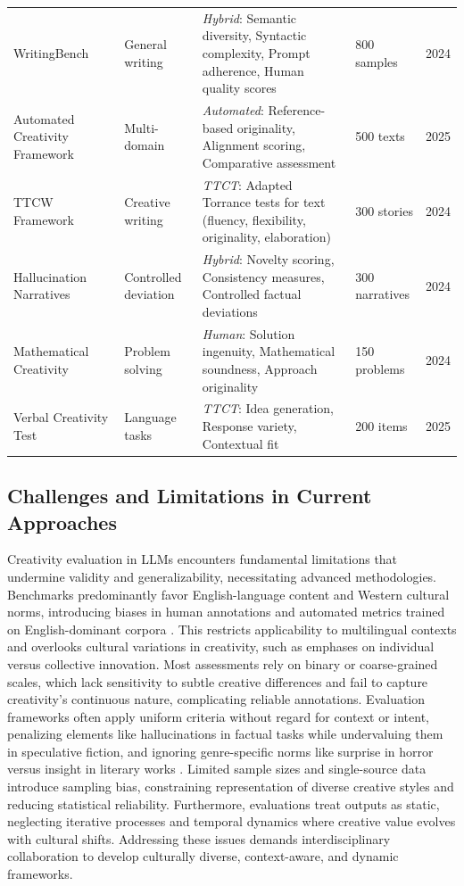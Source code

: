 \documentclass{llncs}
\begin{document}
\begin{table}[ht]
{\begin{tabular}{l l p{8cm} l l}
WritingBench~\cite{wu2024writingbench}   & General writing & \textit{Hybrid}: Semantic diversity, Syntactic complexity, Prompt adherence, Human quality scores & 800 samples & 2024 \\
Automated Creativity Framework~\cite{li2025automated}   & Multi-domain & \textit{Automated}: Reference-based originality, Alignment scoring, Comparative assessment & 500 texts & 2025 \\
TTCW Framework~\cite{chakrabarty2024art}   & Creative writing & \textit{TTCT}: Adapted Torrance tests for text (fluency, flexibility, originality, elaboration) & 300 stories & 2024 \\
Hallucination Narratives~\cite{sun2024hallucinating}   & Controlled deviation & \textit{Hybrid}: Novelty scoring, Consistency measures, Controlled factual deviations & 300 narratives & 2024 \\
Mathematical Creativity~\cite{ye2024assessing}   & Problem solving & \textit{Human}: Solution ingenuity, Mathematical soundness, Approach originality & 150 problems & 2024 \\
Verbal Creativity Test~\cite{dinu2025testing}   & Language tasks & \textit{TTCT}: Idea generation, Response variety, Contextual fit & 200 items & 2025 \\
\hline
\end{tabular}
}
\end{table}


\subsection{Challenges and Limitations in Current Approaches}

Creativity evaluation in LLMs encounters fundamental limitations that undermine validity and generalizability, necessitating advanced methodologies. Benchmarks predominantly favor English-language content and Western cultural norms, introducing biases in human annotations and automated metrics trained on English-dominant corpora \cite{franceschelli2024creativity}. This restricts applicability to multilingual contexts and overlooks cultural variations in creativity, such as emphases on individual versus collective innovation. Most assessments rely on binary or coarse-grained scales, which lack sensitivity to subtle creative differences and fail to capture creativity's continuous nature, complicating reliable annotations. Evaluation frameworks often apply uniform criteria without regard for context or intent, penalizing elements like hallucinations in factual tasks while undervaluing them in speculative fiction, and ignoring genre-specific norms like surprise in horror versus insight in literary works \cite{franceschelli2024creativity}. Limited sample sizes and single-source data introduce sampling bias, constraining representation of diverse creative styles and reducing statistical reliability. Furthermore, evaluations treat outputs as static, neglecting iterative processes and temporal dynamics where creative value evolves with cultural shifts. Addressing these issues demands interdisciplinary collaboration to develop culturally diverse, context-aware, and dynamic frameworks.
\end{document}
